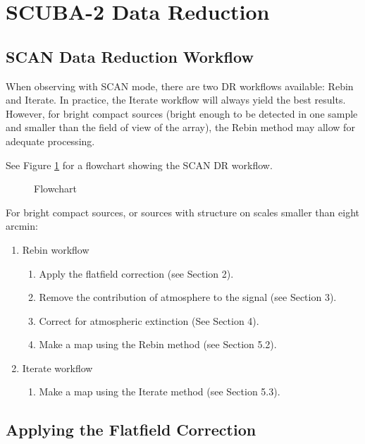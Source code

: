 \documentclass[twoside,11pt]{article}
\newcommand{\xlabel}[1]{}
\renewcommand{\_}{\texttt{\symbol{95}}}
\begin{document}
\section{\xlabel{scuba2}SCUBA-2 Data Reduction\label{se:sc2dr}}

\subsection{SCAN Data Reduction Workflow}

When observing with SCAN mode, there are two DR workflows available:
Rebin and Iterate. In practice, the Iterate workflow will always yield
the best results. However, for bright compact sources (bright enough
to be detected in one sample and smaller than the field of view of the
array), the Rebin method may allow for adequate processing.

See Figure \ref{flow} for a flowchart showing the SCAN DR workflow.

\begin{figure}
\caption{Flowchart\label{flow}}
\end{figure}

For bright compact sources, or sources with structure on scales
smaller than eight arcmin:
\begin{enumerate}
\item Rebin workflow
  \begin{enumerate}
  \item Apply the flatfield correction (see Section 2).
  \item Remove the contribution of atmosphere to the signal (see Section 3).
  \item Correct for atmospheric extinction (See Section 4).
  \item Make a map using the Rebin method (see Section 5.2).
  \end{enumerate}

\item Iterate workflow
  \begin{enumerate}
  \item Make a map using the Iterate method (see Section 5.3).
  \end{enumerate}
\end{enumerate}

\subsection{Applying the Flatfield Correction}
\end{document}

